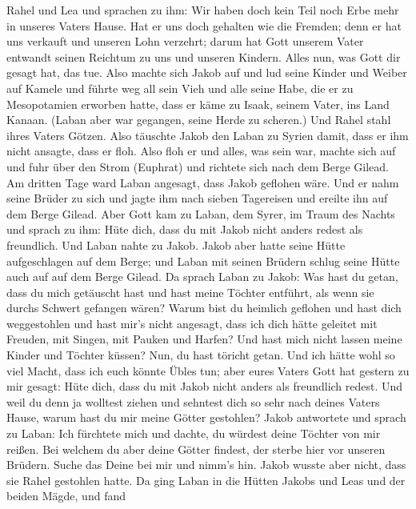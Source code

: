 Rahel und Lea und sprachen zu ihm: Wir haben doch kein Teil noch Erbe
mehr in unseres Vaters Hause.  Hat er uns doch gehalten wie
die Fremden; denn er hat uns verkauft und unseren Lohn verzehrt;
 darum hat Gott unserem Vater entwandt seinen Reichtum zu
uns und unseren Kindern. Alles nun, was Gott dir gesagt hat, das tue.
 Also machte sich Jakob auf und lud seine Kinder und Weiber
auf Kamele  und führte weg all sein Vieh und alle seine
Habe, die er zu Mesopotamien erworben hatte, dass er käme zu Isaak,
seinem Vater, ins Land Kanaan.  (Laban aber war gegangen,
seine Herde zu scheren.) Und Rahel stahl ihres Vaters Götzen.
 Also täuschte Jakob den Laban zu Syrien damit, dass er ihm
nicht ansagte, dass er floh.  Also floh er und alles, was
sein war, machte sich auf und fuhr über den Strom (Euphrat) und richtete
sich nach dem Berge Gilead.  Am dritten Tage ward Laban
angesagt, dass Jakob geflohen wäre.  Und er nahm seine
Brüder zu sich und jagte ihm nach sieben Tagereisen und ereilte ihn auf
dem Berge Gilead.  Aber Gott kam zu Laban, dem Syrer, im
Traum des Nachts und sprach zu ihm: Hüte dich, dass du mit Jakob nicht
anders redest als freundlich.  Und Laban nahte zu Jakob.
Jakob aber hatte seine Hütte aufgeschlagen auf dem Berge; und Laban mit
seinen Brüdern schlug seine Hütte auch auf auf dem Berge Gilead.
 Da sprach Laban zu Jakob: Was hast du getan, dass du mich
getäuscht hast und hast meine Töchter entführt, als wenn sie durchs
Schwert gefangen wären?  Warum bist du heimlich geflohen
und hast dich weggestohlen und hast mir's nicht angesagt, dass ich dich
hätte geleitet mit Freuden, mit Singen, mit Pauken und Harfen?
 Und hast mich nicht lassen meine Kinder und Töchter
küssen? Nun, du hast töricht getan.  Und ich hätte wohl so
viel Macht, dass ich euch könnte Übles tun; aber eures Vaters Gott hat
gestern zu mir gesagt: Hüte dich, dass du mit Jakob nicht anders als
freundlich redest.  Und weil du denn ja wolltest ziehen und
sehntest dich so sehr nach deines Vaters Hause, warum hast du mir meine
Götter gestohlen?  Jakob antwortete und sprach zu Laban:
Ich fürchtete mich und dachte, du würdest deine Töchter von mir reißen.
 Bei welchem du aber deine Götter findest, der sterbe hier
vor unseren Brüdern. Suche das Deine bei mir und nimm's hin. Jakob
wusste aber nicht, dass sie Rahel gestohlen hatte.  Da ging
Laban in die Hütten Jakobs und Leas und der beiden Mägde, und fand
